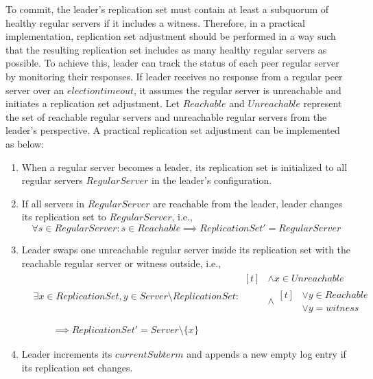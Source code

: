 To commit, the leader's replication set must contain at least a subquorum of healthy regular servers if it includes a witness. Therefore, in a practical implementation, replication set adjustment should be performed in a way such that the resulting replication set includes as many healthy regular servers as possible. To achieve this, leader can track the status of each peer regular server by monitoring their responses. If leader receives no response from a regular peer server over an $election timeout$, it assumes the regular server is unreachable and initiates a replication set adjustment. Let $Reachable$ and $Unreachable$ represent the set of reachable regular servers and unreachable regular servers from the leader's perspective. A practical replication set adjustment can be implemented as below:
\begin{enumerate}
    \item When a regular server becomes a leader, its replication set is initialized to all regular servers $RegularServer$ in the leader's configuration.
    \item If all servers in $RegularServer$ are reachable from the leader, leader changes its replication set to $RegularServer$, i.e.,
          \begin{displaymath}
              \forall s \in RegularServer : s \in Reachable \implies ReplicationSet' = RegularServer
          \end{displaymath}
    \item Leader swaps one unreachable regular server inside its replication set with the reachable regular server or witness outside, i.e.,
          \begin{displaymath}
              \begin{aligned}
                   & \exists x \in ReplicationSet, y \in Server \setminus ReplicationSet :
                  \!\begin{aligned}[t]
                         & \land x \in Unreachable   \\
                         & \land
                        \!\begin{aligned}[t]
                             & \lor y \in Reachable \\
                             & \lor y = witness
                        \end{aligned} \\
                    \end{aligned} \\
                   & \qquad \implies ReplicationSet' = Server \setminus \{x\}
              \end{aligned}
          \end{displaymath}
    \item Leader increments its $currentSubterm$ and appends a new empty log entry if its replication set changes.
\end{enumerate}

